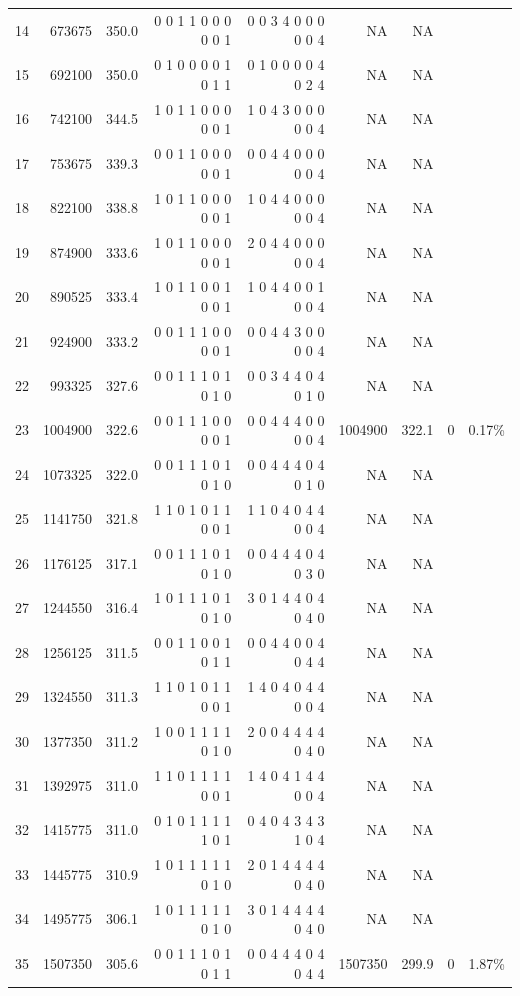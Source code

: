 \documentclass[10pt,journal,compsoc]{IEEEtran}
\begin{document}
\begin{table}[ht]
{\begin{tabular}{|*{9}{r|}}
14	&673675	&   350.0	&0 0 1 1 0 0 0 0 0 1	&0 0 3 4 0 0 0 0 0 4	&			NA	&NA&&\\
15	&692100	&   350.0	&0 1 0 0 0 0 1 0 1 1	&0 1 0 0 0 0 4 0 2 4	&			NA	&NA&&\\
16	&742100	&   344.5	&1 0 1 1 0 0 0 0 0 1	&1 0 4 3 0 0 0 0 0 4	&			NA	&NA&&\\
17	&753675	&   339.3	&0 0 1 1 0 0 0 0 0 1	&0 0 4 4 0 0 0 0 0 4	&			NA	&NA&&\\
18	&822100	&   338.8	&1 0 1 1 0 0 0 0 0 1	&1 0 4 4 0 0 0 0 0 4	&			NA	&NA&&\\
19	&874900	&   333.6	&1 0 1 1 0 0 0 0 0 1	&2 0 4 4 0 0 0 0 0 4	&			NA	&NA&&\\
20	&890525	&   333.4	&1 0 1 1 0 0 1 0 0 1	&1 0 4 4 0 0 1 0 0 4	&			NA	&NA&&\\
21	&924900	&   333.2	&0 0 1 1 1 0 0 0 0 1	&0 0 4 4 3 0 0 0 0 4	&			NA	&NA&&\\
22	&993325	&   327.6	&0 0 1 1 1 0 1 0 1 0	&0 0 3 4 4 0 4 0 1 0	&			NA	&NA&&\\
23	&1004900&   322.6	&0 0 1 1 1 0 0 0 0 1	&0 0 4 4 4 0 0 0 0 4	&	\cellcolor{blizzardblue}       1004900	&\cellcolor{blizzardblue}322.1&\cellcolor{blizzardblue}	0	&\cellcolor{blizzardblue}0.17\%\\
24	&1073325&   322.0	&0 0 1 1 1 0 1 0 1 0	&0 0 4 4 4 0 4 0 1 0	&			NA	&NA&&\\
25	&1141750&   321.8	&1 1 0 1 0 1 1 0 0 1	&1 1 0 4 0 4 4 0 0 4	&			NA	&NA&&\\
26	&1176125&   317.1	&0 0 1 1 1 0 1 0 1 0	&0 0 4 4 4 0 4 0 3 0	&			NA	&NA&&\\
27	&1244550&   316.4	&1 0 1 1 1 0 1 0 1 0	&3 0 1 4 4 0 4 0 4 0	&			NA	&NA&&\\
28	&1256125&   311.5	&0 0 1 1 0 0 1 0 1 1	&0 0 4 4 0 0 4 0 4 4	&			NA	&NA&&\\
29	&1324550&   311.3	&1 1 0 1 0 1 1 0 0 1	&1 4 0 4 0 4 4 0 0 4	&			NA	&NA&&\\
30	&1377350&   311.2	&1 0 0 1 1 1 1 0 1 0	&2 0 0 4 4 4 4 0 4 0	&			NA	&NA&&\\
31	&1392975&   311.0	&1 1 0 1 1 1 1 0 0 1	&1 4 0 4 1 4 4 0 0 4	&			NA	&NA&&\\
32	&1415775&   311.0	&0 1 0 1 1 1 1 1 0 1	&0 4 0 4 3 4 3 1 0 4	&			NA	&NA&&\\
33	&1445775&   310.9	&1 0 1 1 1 1 1 0 1 0	&2 0 1 4 4 4 4 0 4 0	&			NA	&NA&&\\
34	&1495775&   306.1	&1 0 1 1 1 1 1 0 1 0	&3 0 1 4 4 4 4 0 4 0	&			NA	&NA&&\\
35	&1507350&   305.6	&0 0 1 1 1 0 1 0 1 1	&0 0 4 4 4 0 4 0 4 4	&	  \cellcolor{blizzardblue}     1507350	&\cellcolor{blizzardblue}299.9	&\cellcolor{blizzardblue}0	&\cellcolor{blizzardblue}1.87\%\\

\end{tabular}}
\end{table}
\end{document}
